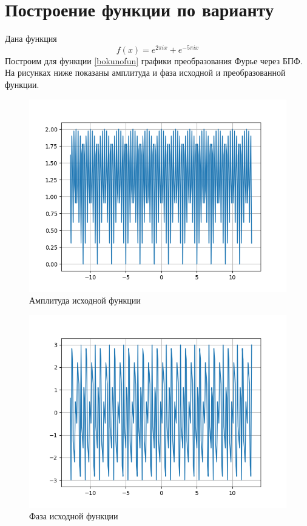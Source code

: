 \section{Построение функции по варианту}{
    Дана функция 
    \begin{equation}\label{bokunofun}
        f(x) = e^{2 \pi i x} + e^{-5 \pi i x}
    \end{equation}
    Построим для функции \eqref{bokunofun} графики преобразования Фурье через БПФ. 
    На рисунках ниже показаны амплитуда и фаза исходной и преобразованной функции.
    
    \begin{figure}[H]
       \centering
            \includegraphics[width=\textwidth,height=\textheight,keepaspectratio]{Amplitude_bokunosource.png}
            \caption{Амплитуда исходной функции}
            \label{bokunoamplitude}
    \end{figure}
    
    \begin{figure}[H]
       \centering
            \includegraphics[width=\textwidth,height=\textheight,keepaspectratio]{Phase_bokunosource.png}
            \caption{Фаза исходной функции}
            \label{bokunophase}
    \end{figure}

}
